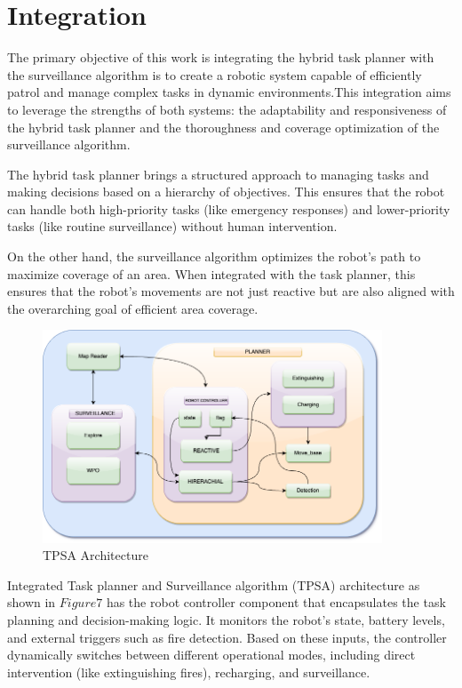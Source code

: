 \chapter{Integration}
The primary objective of this work is integrating the hybrid task planner with the surveillance algorithm is to create a robotic system capable of efficiently patrol and manage complex tasks in dynamic environments.This integration aims to leverage the strengths of both systems: the adaptability and responsiveness of the hybrid task planner and the thoroughness and coverage optimization of the surveillance algorithm.

The hybrid task planner brings a structured approach to managing tasks and making decisions based on a hierarchy of objectives. This ensures that the robot can handle both high-priority tasks (like emergency responses) and lower-priority tasks (like routine surveillance) without human intervention.

On the other hand, the surveillance algorithm optimizes the robot's path to maximize coverage of an area. When integrated with the task planner, this ensures that the robot's movements are not just reactive but are also aligned with the overarching goal of efficient area coverage.



\begin{figure}[h]
  \centering
  \includegraphics[width=0.9\textwidth, height=0.4\textheight]{Bilder/TPSA.png}
  \caption{TPSA Architecture}
  \label{fig:frontier}
\end{figure}

Integrated Task planner and Surveillance algorithm (TPSA) architecture as shown in \(Figure 7\) has the robot controller component that  encapsulates the task planning and decision-making logic. It monitors the robot's state, battery levels, and external triggers such as fire detection. Based on these inputs, the controller dynamically switches between different operational modes, including direct intervention (like extinguishing fires), recharging, and surveillance.
